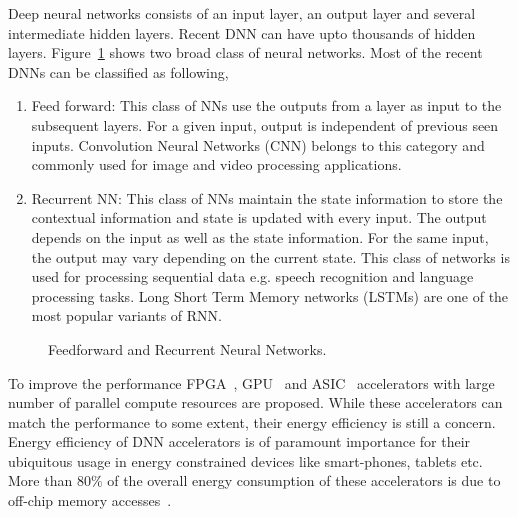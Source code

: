 \documentclass[a4paper,10pt]{article}
\begin{document}
Deep neural networks consists of an input layer, an output layer and several intermediate hidden layers. Recent DNN can have upto thousands of hidden layers. Figure~\ref{fig:typesNN} shows two broad class of neural networks. Most of the recent DNNs can be classified as following,
\begin{enumerate}
	\item Feed forward: This class of NNs use the outputs from a layer as input to the subsequent layers. For a given input, output is independent of previous seen inputs. Convolution Neural Networks (CNN) belongs to this category and commonly used for image and video processing applications. 
	\item Recurrent NN: This class of NNs maintain the state information to store the contextual information and state is updated with every input. The output depends on the input as well as the state information. For the same input, the output may vary depending on the current state. This class of networks is used for processing sequential data e.g. speech recognition and language processing tasks. Long Short Term Memory networks (LSTMs) are one of the most popular variants of RNN.
\end{enumerate}
\begin{figure}[!htb]
	\centering
	\hfil
	\caption{Feedforward and Recurrent Neural Networks.}
	\label{fig:typesNN}
	\vspace{-1.0em}	
\end{figure}
To improve the performance  FPGA~\cite{zhang2015optimizing,wei2019overcoming,gokhale2014240,8742284,gupta2015deep,alwani2016fused}, GPU~\cite{chetlur2014cudnn} and ASIC~\cite{Chen2016EyerissAS,chen2014diannao,chen2014dadiannao,du2015shidiannao} accelerators with large number of parallel compute resources are proposed. While these accelerators can match the performance to some extent, their energy efficiency is still a concern.  Energy efficiency of DNN accelerators is of paramount importance for their ubiquitous usage in energy constrained devices like smart-phones, tablets etc. More than 80\% of the overall energy consumption of these accelerators is due to off-chip memory accesses~\cite{chen2014diannao}. 
\end{document}
